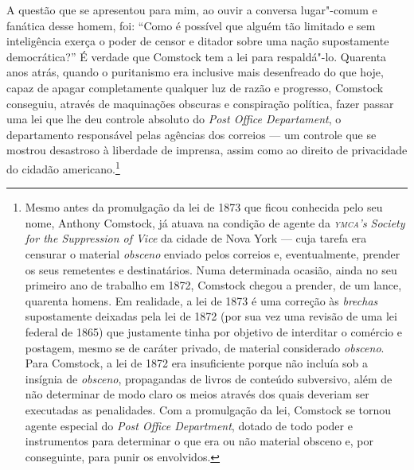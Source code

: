 A questão que se apresentou para mim, ao ouvir a conversa lugar"-comum e
fanática desse homem, foi: ``Como é possível que alguém tão limitado e
sem inteligência exerça o poder de censor e ditador sobre uma nação
supostamente democrática?'' É verdade que Comstock tem a lei para
respaldá"-lo. Quarenta anos atrás, quando o puritanismo era inclusive
mais desenfreado do que hoje, capaz de apagar completamente qualquer luz
de razão e progresso, Comstock conseguiu, através de maquinações
obscuras e conspiração política, fazer passar uma lei que lhe deu
controle absoluto do \textit{Post Office Departament}, o departamento responsável pelas agências dos
correios --- um controle que se
mostrou desastroso à liberdade de imprensa, assim como ao direito de
privacidade do cidadão americano.\footnote{Mesmo antes da promulgação da
  lei de 1873 que ficou conhecida pelo seu nome, Anthony Comstock, já
  atuava na condição de agente da \textit{\textsc{ymca}'s Society for the
  Suppression of Vice} da cidade de Nova York --- cuja tarefa era
  censurar o material \textit{obsceno} enviado pelos correios e,
  eventualmente, prender os seus remetentes e destinatários. Numa
  determinada ocasião, ainda no seu primeiro ano de trabalho em 1872,
  Comstock chegou a prender, de um lance, quarenta homens. Em realidade,
  a lei de 1873 é uma correção às \textit{brechas} supostamente deixadas pela
  lei de 1872 (por sua vez uma revisão de uma lei federal de 1865) que
  justamente tinha por objetivo de interditar o comércio e postagem,
  mesmo se de caráter privado, de material considerado \textit{obsceno}. Para
  Comstock, a lei de 1872 era insuficiente porque não incluía sob a
  insígnia de \textit{obsceno}, propagandas de livros de conteúdo subversivo,
  além de não determinar de modo claro os meios através dos quais
  deveriam ser executadas as penalidades. Com a promulgação da lei,
  Comstock se tornou agente especial do \textit{Post Office Department},
  dotado de todo poder e instrumentos para determinar o que era ou não
  material obsceno e, por conseguinte, para punir os envolvidos.}

